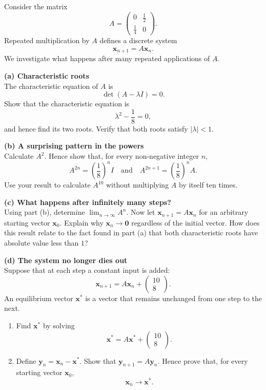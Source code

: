 \begin{problem}
Consider the matrix
\[ A= \begin{pmatrix} 0 & \frac12\\[2mm] \frac14 & 0 \end{pmatrix}. \]
Repeated multiplication by $A$ defines a discrete system
\[ \mathbf{x}_{n+1}=A\mathbf{x}_n. \]
We investigate what happens after many repeated applications of $A$.

\textbf{(a) Characteristic roots}\\
The characteristic equation of $A$ is
\[ \det(A-\lambda I)=0. \]
Show that the characteristic equation is
\[ \lambda^2-\frac18=0, \]
and hence find its two roots. Verify that both roots satisfy $|\lambda|<1$.

\textbf{(b) A surprising pattern in the powers}\\
Calculate $A^2$. Hence show that, for every non-negative integer $n$,
\[ A^{2n} = \left(\frac18\right)^n I \quad \text{and} \quad A^{2n+1} = \left(\frac18\right)^n A. \]
Use your result to calculate $A^{10}$ without multiplying $A$ by itself ten times.

\textbf{(c) What happens after infinitely many steps?}\\
Using part (b), determine $\lim_{n\to\infty}A^n$.
Now let $\mathbf{x}_{n+1}=A\mathbf{x}_n$ for an arbitrary starting vector $\mathbf{x}_0$.
Explain why $\mathbf{x}_n\to\mathbf{0}$ regardless of the initial vector.
How does this result relate to the fact found in part (a) that both characteristic roots have absolute value less than $1$?

\textbf{(d) The system no longer dies out}\\
Suppose that at each step a constant input is added:
\[ \mathbf{x}_{n+1} = A\mathbf{x}_n+ \begin{pmatrix} 10\\ 8 \end{pmatrix}. \]
An equilibrium vector $\mathbf{x}^*$ is a vector that remains unchanged from one step to the next.
\begin{enumerate}
\item[(i)] Find $\mathbf{x}^*$ by solving
\[ \mathbf{x}^* = A\mathbf{x}^* + \begin{pmatrix} 10\\ 8 \end{pmatrix}. \]
\item[(ii)] Define $\mathbf{y}_n=\mathbf{x}_n-\mathbf{x}^*$. Show that $\mathbf{y}_{n+1}=A\mathbf{y}_n$. Hence prove that, for every starting vector $\mathbf{x}_0$,
\[ \boxed{\mathbf{x}_n\to\mathbf{x}^*}. \]
\end{enumerate}
\end{problem}

